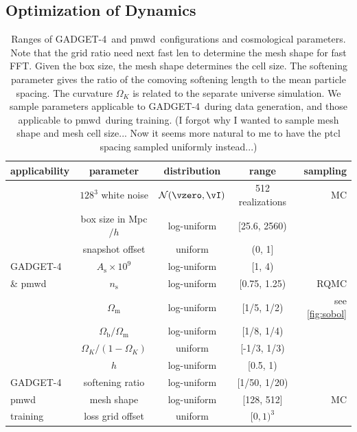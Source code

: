 \documentclass[modern, trackchanges, dvipsnames]{aastex631}
\newcommand{\pmwd}{{\usefont{T1}{nova}{m}{sl}pmwd}}
\newcommand{\GADGET}{{{\fontsize{10pt}{12pt}\selectfont GADGET}-4}}
\newcommand{\As}{A_\mathrm{s}}
\newcommand{\ns}{n_\mathrm{s}}
\newcommand{\Omegam}{\Omega_\mathrm{m}}
\newcommand{\Omegab}{\Omega_\mathrm{b}}
\newcommand{\OmegaK}{\Omega_K}
\newcommand{\YL}[1]{\textcolor{Bittersweet}{#1}}
\begin{document}
\subsection{Optimization of Dynamics}

\begin{table}
  \centering
  \caption{Ranges of \GADGET\ and \pmwd\ configurations and cosmological
  parameters.
  Note that the grid ratio need next fast len to determine the mesh shape
  for fast FFT.
  Given the box size, the mesh shape determines the cell size.
  The softening parameter gives the ratio of the comoving softening length
  to the mean particle spacing.
  The curvature $\OmegaK$ is related to the separate universe simulation.
  We sample parameters applicable to \GADGET\ during data generation, and
  those applicable to \pmwd\ during training.
  \YL{(I forgot why I wanted to sample mesh shape and mesh cell size...
  Now it seems more natural to me to have the ptcl spacing sampled
  uniformly instead...)}
  }
  \label{tab:param}
  \begin{tabular}{lcccr}
  \toprule
  applicability & parameter & distribution & range & sampling \\
  \midrule
  & $128^3$ white noise & $\mathcal{N}(\vzero, \vI)$ & 512 realizations & MC \\
  \cmidrule(lr){2-5}
  & box size in Mpc$/h$ & \YL{log-uniform} & [25.6, 2560) \\
  \cmidrule(lr){2-4}
  & snapshot offset & uniform & (0, 1] \\
  \cmidrule(lr){2-4}
  \GADGET\ & $\As \times 10^9$ & log-uniform & [1, 4) \\
  \cmidrule(lr){2-4}
  \& \pmwd\ & $\ns$ & log-uniform & [0.75, 1.25) & RQMC \\
  \cmidrule(lr){2-4}
  & $\Omegam$ & log-uniform & [1/5, 1/2) & see \autoref{fig:sobol} \\
  \cmidrule(lr){2-4}
  & $\Omegab / \Omegam$ & log-uniform & [1/8, 1/4) \\
  \cmidrule(lr){2-4}
  & $\OmegaK / (1 - \OmegaK)$ & uniform & [-1/3, 1/3) \\
  \cmidrule(lr){2-4}
  & $h$ & log-uniform & [0.5, 1) \\
  \cmidrule(lr){1-4}
  \GADGET\ & softening ratio & log-uniform & [1/50, 1/20) \\
  \cmidrule(lr){1-5}
  \pmwd\ & mesh shape & log-uniform & [128, 512] & MC \\
  \cmidrule(lr){2-4}
  \cmidrule(lr){1-4}
  training & loss grid offset & uniform & $[0, 1)^3$ \\
  \bottomrule
  \end{tabular}
  \end{table}
\end{document}
